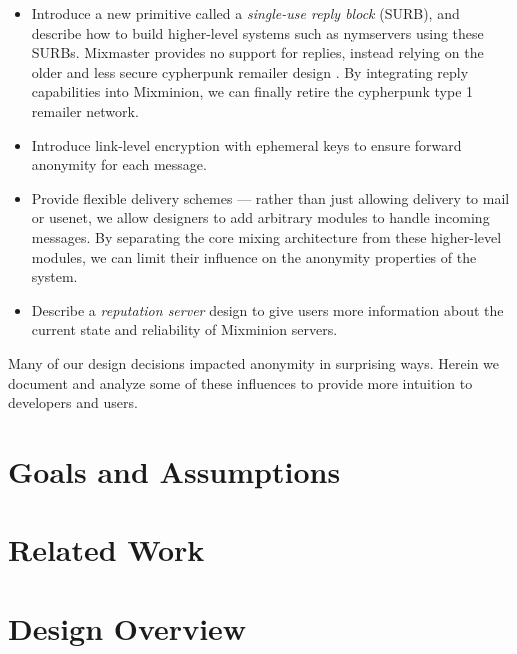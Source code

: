 \documentclass{llncs}
\begin{document}
\begin{itemize}
\item Introduce a new primitive called a \emph{single-use reply block}
(SURB), and describe how to build higher-level systems such as nymservers
using these SURBs. Mixmaster provides no support for replies, instead
relying on the older and less secure cypherpunk remailer design
\cite{cypherpunk-remailer}.  By integrating reply capabilities into
Mixminion, we can finally retire the cypherpunk type 1 remailer network.
\item Introduce link-level encryption with ephemeral keys to ensure
forward anonymity for each message.
\item Provide flexible delivery schemes --- rather than just allowing
delivery to mail or usenet, we allow designers to add arbitrary modules to
handle incoming messages. By separating the core mixing architecture from
these higher-level modules, we can limit their influence on the anonymity
properties of the system.
\item Describe a \emph{reputation server} design to give users more
information about the current state and reliability of Mixminion servers.
\end{itemize}

Many of our design decisions impacted anonymity in surprising ways. Herein
we document and analyze some of these influences to provide more intuition
to developers and users.



\section{Goals and Assumptions}



\section{Related Work}


\section{Design Overview}
\end{document}
